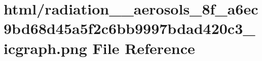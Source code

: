 \hypertarget{radiation____aerosols__8f__a6ec9bd68d45a5f2c6bb9997bdad420c3__icgraph_8png}{}\section{html/radiation\+\_\+\+\_\+aerosols\+\_\+8f\+\_\+a6ec9bd68d45a5f2c6bb9997bdad420c3\+\_\+icgraph.png File Reference}
\label{radiation____aerosols__8f__a6ec9bd68d45a5f2c6bb9997bdad420c3__icgraph_8png}
